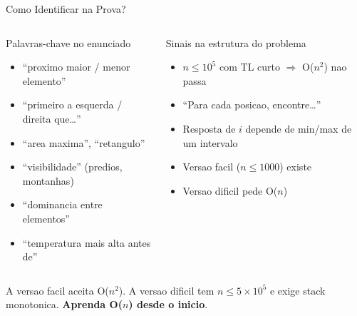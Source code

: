\documentclass[aspectratio=169,11pt]{beamer}
\begin{document}
\begin{frame}[shrink=4]{Como Identificar na Prova?}
  \begin{columns}[t]
      \begin{block}{Palavras-chave no enunciado}
        \begin{itemize}\small
          \item ``proximo maior / menor elemento''
          \item ``primeiro a esquerda / direita que\ldots''
          \item ``area maxima'', ``retangulo''
          \item ``visibilidade'' (predios, montanhas)
          \item ``dominancia entre elementos''
          \item ``temperatura mais alta antes de''
        \end{itemize}
      \end{block}
      \begin{exampleblock}{Sinais na estrutura do problema}
        \begin{itemize}\small
          \item $n \le 10^5$ com TL curto $\Rightarrow$ O($n^2$) nao passa
          \item ``Para cada posicao, encontre\ldots''
          \item Resposta de $i$ depende de min/max de um intervalo
          \item Versao facil ($n \le 1000$) existe
          \item Versao dificil pede O($n$)
        \end{itemize}
      \end{exampleblock}
  \end{columns}
  \vspace{0.15cm}
  \begin{tcolorbox}[caixaAmarelo,title={Armadilha Classica das Maratonas}]
    \small
    A versao facil aceita O($n^2$). A versao dificil tem $n \le 5{\times}10^5$
    e exige stack monotonica. \textbf{Aprenda O($n$) desde o inicio}.
  \end{tcolorbox}
\end{frame}
\end{document}
